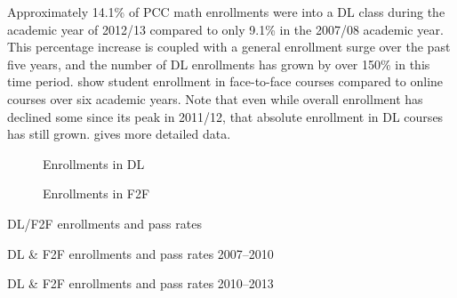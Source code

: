 Approximately 14.1\% of PCC math enrollments were into a DL class during the academic year of 2012/13 compared to only 9.1\% in the 2007/08 academic year. This percentage increase is coupled with a general enrollment surge over the past five years, and the number of DL enrollments has grown by over 150\% in this time period.  show student enrollment in face-to-face courses compared to online courses over six academic years. Note that even while overall enrollment has declined some since its peak in 2011/12, that absolute enrollment in DL courses has still grown.  gives more detailed data.

\begin{figure}[!htb]
    \begin{minipage}{.5\textwidth}
          
          \caption{Enrollments in DL}\label{fig:sec3:DLenrollments}
    \end{minipage}%
    \begin{minipage}{.5\textwidth}
          
          \caption{Enrollments in F2F}\label{fig:sec3:F2Fenrollments}
    \end{minipage}
\end{figure}

\begin{table}
  	\caption{DL/F2F enrollments and pass rates}\label{tab:sec3:F2FandDLdata}
	\centering
	\begin{minipage}{\textwidth}
          
          \vspace{2pc}
          
          \end{minipage}
\end{table}

\begin{table}
	\begin{widepage}
	\centering
  	\caption{DL \& F2F enrollments and pass rates 2007--2010}%
          
          \vspace{2pc}
  	\caption{DL \& F2F enrollments and pass rates 2010--2013}
          
          \end{widepage}
\end{table}

